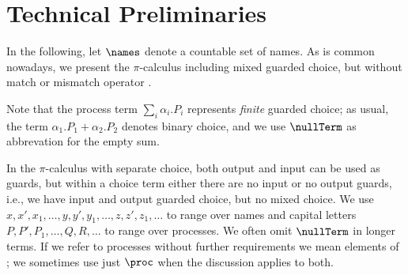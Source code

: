 \documentclass[11pt,techReport]{eptcs}
\begin{document}
\section{Technical Preliminaries} \label{sec:techn-prel}

In the following, let $ \names $ denote a countable set of names. As is common nowadays, we present the $ \pi $-calculus including mixed guarded choice, but without match or mismatch operator \cite{sangiorgiWalker01, palamidessi03}.

\noindent
Note that the process term $ \sum_{i}{\alpha_i.P_i} $ represents \emph{finite} guarded choice; as usual, the term ${\alpha_1.P_1}+{\alpha_2.P_2}$ denotes binary choice,  and we use $ \nullTerm $ as abbrevation for the empty sum.

In the $ \pi $-calculus with separate choice, both output and input can be used as guards, but within a choice term either there are no input or no output guards, i.e., we have input and output guarded choice, but no mixed choice.
We use $ x, x', x_1, \ldots, y, y', y_1, \ldots, z, z', z_1, \ldots $ to range over names and capital letters $ P, P', P_1, \ldots, Q, R, \ldots $ to range over processes. We often omit $ \nullTerm $ in longer terms. If we refer to processes without further requirements we mean elements of \procmix; we sometimes use just $\proc$ when the discussion applies to both.
\end{document}
